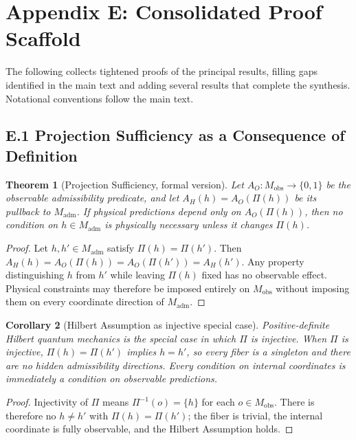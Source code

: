 \documentclass[12pt,a4paper]{article}
\newtheorem{theorem}{Theorem}[section]
\newtheorem{corollary}[theorem]{Corollary}
\theoremstyle{remark}
\begin{document}
\section*{Appendix E: Consolidated Proof Scaffold}

The following collects tightened proofs of the principal results, filling
gaps identified in the main text and adding several results that complete
the synthesis. Notational conventions follow the main text.

\subsection*{E.1 Projection Sufficiency as a Consequence of Definition}

\begin{theorem}[Projection Sufficiency, formal version]
Let $A_O : M_{\mathrm{obs}} \to \{0,1\}$ be the observable admissibility
predicate, and let $A_H(h) = A_O(\Pi(h))$ be its pullback to
$M_{\mathrm{adm}}$. If physical predictions depend only on $A_O(\Pi(h))$,
then no condition on $h \in M_{\mathrm{adm}}$ is physically necessary
unless it changes $\Pi(h)$.
\end{theorem}

\begin{proof}
Let $h, h' \in M_{\mathrm{adm}}$ satisfy $\Pi(h) = \Pi(h')$. Then
$A_H(h) = A_O(\Pi(h)) = A_O(\Pi(h')) = A_H(h')$.
Any property distinguishing $h$ from $h'$ while leaving $\Pi(h)$ fixed
has no observable effect. Physical constraints may therefore be imposed
entirely on $M_{\mathrm{obs}}$ without imposing them on every coordinate
direction of $M_{\mathrm{adm}}$.
\end{proof}

\begin{corollary}[Hilbert Assumption as injective special case]
Positive-definite Hilbert quantum mechanics is the special case in which
$\Pi$ is injective. When $\Pi$ is injective, $\Pi(h) = \Pi(h')$ implies
$h = h'$, so every fiber is a singleton and there are no hidden
admissibility directions. Every condition on internal coordinates is
immediately a condition on observable predictions.
\end{corollary}

\begin{proof}
Injectivity of $\Pi$ means $\Pi^{-1}(o) = \{h\}$ for each $o \in M_{\mathrm{obs}}$.
There is therefore no $h \neq h'$ with $\Pi(h) = \Pi(h')$; the fiber is
trivial, the internal coordinate is fully observable, and the Hilbert
Assumption holds.
\end{proof}
\end{document}
